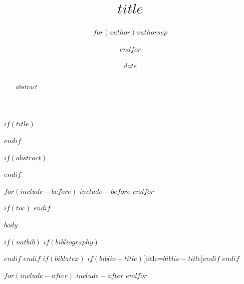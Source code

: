 \documentclass[$if(fontsize)$$fontsize$$else$12pt$endif$$if(lang)$,$lang$$endif$]{article}
\title{$title$}
\author{$for(author)$$author$$sep$ \and $endfor$}
\date{$date$}
\date{}
\begin{document}
$if(title)$
\maketitle
$endif$

$if(abstract)$
\begin{abstract}
$abstract$
\end{abstract}
$endif$

$for(include-before)$
$include-before$
$endfor$

$if(toc)$
\tableofcontents
\newpage
$endif$

$body$

$if(natbib)$
$if(bibliography)$

$endif$
$endif$
$if(biblatex)$
\printbibliography$if(biblio-title)$[title=$biblio-title$]$endif$
$endif$

$for(include-after)$
$include-after$
$endfor$
\end{document}
